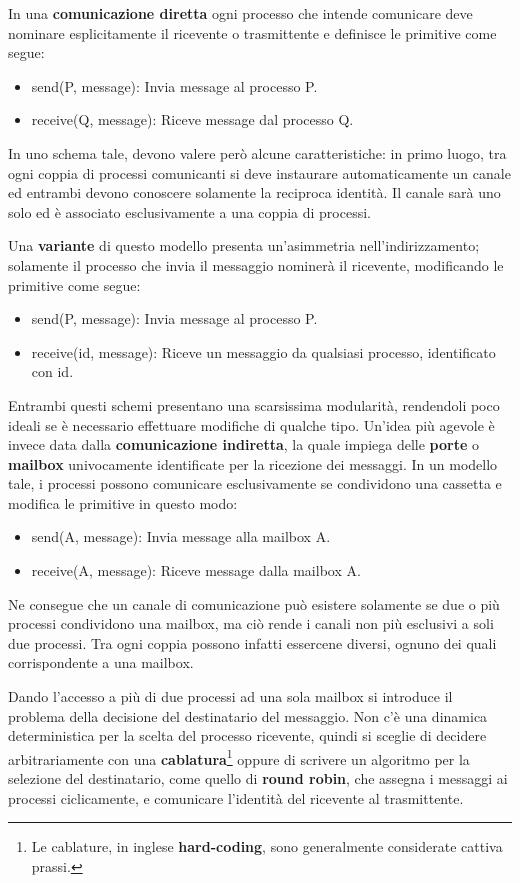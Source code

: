 \noindent In una \textbf{comunicazione diretta} ogni processo che intende comunicare deve nominare esplicitamente il ricevente o trasmittente e definisce le primitive come segue: \begin{itemize}
	\item send(P, message): Invia message al processo P.
	\item receive(Q, message): Riceve message dal processo Q.
\end{itemize}
\noindent In uno schema tale, devono valere però alcune caratteristiche: in primo luogo, tra ogni coppia di processi comunicanti si deve instaurare automaticamente un canale ed entrambi devono conoscere solamente la reciproca identità. Il canale sarà uno solo ed è associato esclusivamente a una coppia di processi.\par
Una \textbf{variante} di questo modello presenta un'asimmetria nell'indirizzamento; solamente il processo che invia il messaggio nominerà il ricevente, modificando le primitive come segue: \begin{itemize}
	\item send(P, message): Invia message al processo P.
	\item receive(id, message): Riceve un messaggio da qualsiasi processo, identificato con id.
\end{itemize}
\noindent Entrambi questi schemi presentano una scarsissima modularità, rendendoli poco ideali se è necessario effettuare modifiche di qualche tipo. Un'idea più agevole è invece data dalla \textbf{comunicazione indiretta}, la quale impiega delle \textbf{porte} o \textbf{mailbox} univocamente identificate per la ricezione dei messaggi. In un modello tale, i processi possono comunicare esclusivamente se condividono una cassetta e modifica le primitive in questo modo: \begin{itemize}
	\item send(A, message): Invia message alla mailbox A.
	\item receive(A, message): Riceve message dalla mailbox A.
\end{itemize}
\noindent Ne consegue che un canale di comunicazione può esistere solamente se due o più processi condividono una mailbox, ma ciò rende i canali non più esclusivi a soli due processi. Tra ogni coppia possono infatti essercene diversi, ognuno dei quali corrispondente a una mailbox.\par
Dando l'accesso a più di due processi ad una sola mailbox si introduce il problema della decisione del destinatario del messaggio. Non c'è una dinamica deterministica per la scelta del processo ricevente, quindi si sceglie di decidere arbitrariamente con una \textbf{cablatura}\footnote{Le cablature, in inglese \textbf{hard-coding}, sono generalmente considerate cattiva prassi.} oppure di scrivere un algoritmo per la selezione del destinatario, come quello di \textbf{round robin}, che assegna i messaggi ai processi ciclicamente, e comunicare l'identità del ricevente al trasmittente.\newline

